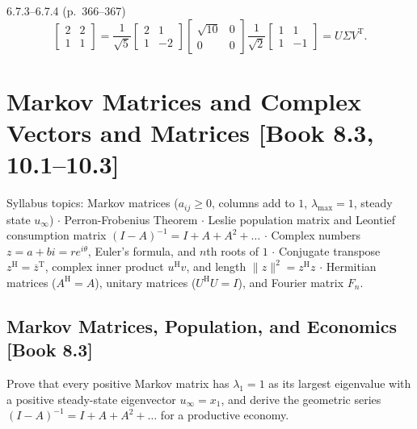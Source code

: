 \documentclass[11pt,a4paper,openany,oneside]{book}
\def\vect#1{#1}%
\def\mathbf#1{#1}%
\def\bk#1{ [Book #1]}%
\newcommand{\vect}[1]{\mathbf{#1}}
\newcommand{\T}{\mathrm{T}}
\newcommand{\Herm}{\mathrm{H}}
\numberwithin{equation}{chapter}
\newcommand{\bk}[1]{\texorpdfstring{\enspace{\normalfont\small\color{slate}[Book #1]}}{ [Book #1]}}
\begin{document}
\begin{pageend_sol}{6.7.3--6.7.4 (p.\ 366--367)}
\[
\begin{bmatrix}2 & 2\\1 & 1\end{bmatrix} = \frac{1}{\sqrt{5}}\begin{bmatrix}2 & 1\\1 & -2\end{bmatrix}\begin{bmatrix}\sqrt{10} & 0\\0 & 0\end{bmatrix}\frac{1}{\sqrt{2}}\begin{bmatrix}1 & 1\\1 & -1\end{bmatrix} = U\Sigma V^\T.
\]
\end{pageend_sol}
\clearpage

\chapter[Markov Matrices and Complex Matrices (8.3, 10.1--10.3)]{Markov Matrices and Complex Vectors and Matrices\bk{8.3, 10.1--10.3}}

\begin{syll}
Syllabus topics: Markov matrices ($a_{ij} \ge 0$, columns add to $1$, $\lambda_{\max} = 1$, steady state $\vect{u}_\infty$) $\cdot$ Perron-Frobenius Theorem $\cdot$ Leslie population matrix and Leontief consumption matrix $(I - A)^{-1} = I + A + A^2 + \dots$ $\cdot$ Complex numbers $z = a + bi = re^{i\theta}$, Euler's formula, and $n$th roots of $1$ $\cdot$ Conjugate transpose $\vect{z}^\Herm = \overline{\vect{z}}^\T$, complex inner product $\vect{u}^\Herm\vect{v}$, and length $\|\vect{z}\|^2 = \vect{z}^\Herm\vect{z}$ $\cdot$ Hermitian matrices ($A^\Herm = A$), unitary matrices ($U^\Herm U = I$), and Fourier matrix $F_n$.
\end{syll}

\section{Markov Matrices, Population, and Economics\bk{8.3}}

\begin{goal}
Prove that every positive Markov matrix has $\lambda_1 = 1$ as its largest eigenvalue with a positive steady-state eigenvector $\vect{u}_\infty = \vect{x}_1$, and derive the geometric series $(I-A)^{-1} = I + A + A^2 + \dots$ for a productive economy.
\end{goal}
\end{document}
